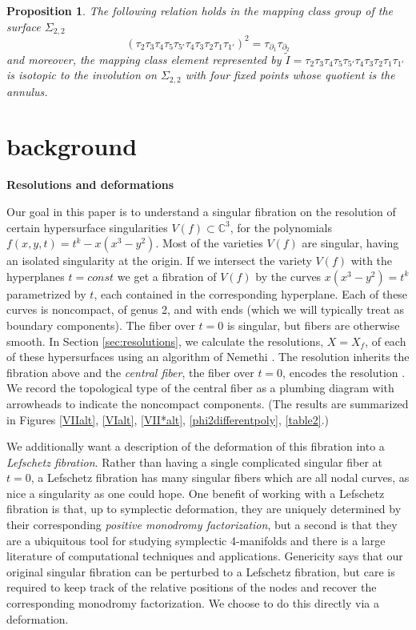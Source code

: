\documentclass[11pt,letterpaper,reqno]{amsart}
\newtheorem{proposition}[theorem]{Proposition}
\theoremstyle{remark}
\newcommand{\CC}{{\mathbb C}}
\begin{document}
\begin{proposition}\label{newlift} The following relation holds in the mapping class group of the surface $\Sigma_{2,2}$
\[(\tau_2 \tau_3 \tau_4 \tau_5 \tau_{5'} \tau_4 \tau_3 \tau_2 \tau_1\tau_{1'})^2 = \tau_{\partial_1} \tau_{\partial_2}\]
and moreover, the mapping class element represented by $\tilde{I} = \tau_2 \tau_3 \tau_4 \tau_5 \tau_{5'} \tau_4 \tau_3 \tau_2 \tau_1\tau_{1'}$ is isotopic to the involution on $\Sigma_{2,2}$ with four fixed points whose quotient is the annulus. 
\end{proposition}


\section{background}
{\bf Resolutions and deformations} 
\label{background}

Our goal in this paper is to understand a singular fibration on the resolution of certain hypersurface singularities $V(f) \subset \CC^3$, for the polynomials $f(x,y,t) = t^k-x(x^3-y^2)$. Most of the varieties $V(f)$ are singular, having an isolated singularity at the origin. If we intersect the variety $V(f)$ with the hyperplanes $t=\mathit{const}$ we get a fibration of $V(f)$ by the curves $x(x^3-y^2)=t^k$ parametrized by $t$, each contained in the corresponding hyperplane. Each of these curves is noncompact, of genus 2, and with ends (which we will typically treat as boundary components). The fiber over $t=0$ is singular, but fibers are otherwise smooth. In Section \ref{sec:resolutions}, we calculate the resolutions, $X = X_f$, of each of these hypersurfaces using an algorithm of Nemethi \cite{Nemethi-lectures}. The resolution inherits the fibration above and the \emph{central fiber}, the fiber over $t=0$, encodes the resolution \cite{mumford}. We record the topological type of the central fiber as a plumbing diagram with arrowheads to indicate the noncompact components. (The results are summarized in Figures \ref{VIIalt}, \ref{VIalt}, \ref{VII*alt}, \ref{phi2differentpoly}, \ref{table2}.) 

We additionally want a description of the deformation of this fibration into a \emph{Lefschetz fibration}. Rather than having a single complicated singular fiber at $t=0$, a Lefschetz fibration has many singular fibers which are all nodal curves, as nice a singularity as one could hope. One benefit of working with a Lefschetz fibration is that, up to symplectic deformation, they are uniquely determined by their corresponding \emph{positive monodromy factorization}, but a second is that they are a ubiquitous \cite{Donaldson} tool for studying symplectic 4-manifolds and there is a large literature of computational techniques and applications. Genericity says that our original singular fibration can be perturbed to a Lefschetz fibration, but care is required to keep track of the relative positions of the nodes and recover the corresponding monodromy factorization. We choose to do this directly via a deformation.
\end{document}
